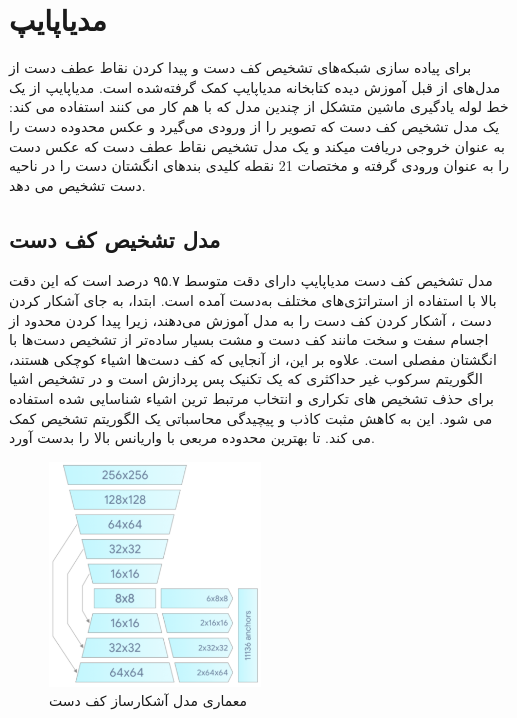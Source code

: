 \section{مدیاپایپ}
برای پیاده سازی شبکه‌های تشخیص کف دست و پیدا کردن نقاط عطف دست از مدل‌های از قبل آموزش دیده کتابخانه مدیاپایپ کمک گرفته‌شده است. مدیاپایپ  از یک خط لوله
یادگیری ماشین متشکل از چندین مدل که با هم کار می کنند استفاده می کند: یک مدل تشخیص کف دست 
که تصویر را از ورودی می‌گیرد و  عکس محدوده دست را به عنوان خروجی دریافت میکند و یک مدل تشخیص نقاط عطف دست 
که عکس دست را به عنوان ورودی گرفته و مختصات‌ 21 نقطه کلیدی بند‌های انگشتان دست را در ناحیه دست تشخیص می دهد.

\subsection{مدل تشخیص کف دست}
مدل تشخیص کف دست مدیاپایپ دارای دقت متوسط ۹۵.۷ درصد است که این دقت بالا با استفاده از استراتژی‌های مختلف به‌دست آمده است. ابتدا، به جای آشکار کردن دست
، آشکار کردن کف دست را به مدل آموزش می‌دهند، زیرا پیدا کردن محدود از اجسام سفت و سخت مانند کف دست و مشت بسیار ساده‌تر از تشخیص دست‌ها با 
انگشتان مفصلی است. علاوه بر این، از آنجایی که کف دست‌ها اشیاء کوچکی هستند، الگوریتم سرکوب غیر حداکثری 
که یک تکنیک پس پردازش  است و در تشخیص اشیا برای حذف تشخیص های تکراری 
و انتخاب مرتبط ترین اشیاء شناسایی شده استفاده می شود. این به کاهش مثبت کاذب  و پیچیدگی محاسباتی 
یک الگوریتم تشخیص کمک می کند. تا بهترین محدوده مربعی  با واریانس بالا  را بدست آورد. \cite{zhang2020mediapipe}


\begin{figure}[h]
    \centering
    \includegraphics[width=0.5\textwidth]{hand_detector.png}
    \caption{معماری مدل آشکارساز کف دست}
\end{figure}

